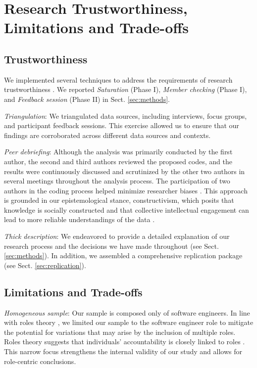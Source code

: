 \section{Research Trustworthiness, Limitations and Trade-offs}\label{sec:trust}

\subsection{Trustworthiness}

\noindent We implemented several techniques to address the requirements of research trustworthiness \citep{miles2014qualitative}. We reported \textit{Saturation} (Phase I), \textit{Member checking} (Phase I), and \emph{Feedback session} (Phase II) in Sect. \ref{sec:methods}.

\textit{Triangulation}: We triangulated data sources, including interviews, focus groups, and participant feedback sessions. This exercise allowed us to ensure that our findings are corroborated across different data sources and contexts.

\textit{Peer debriefing}: Although the analysis was primarily conducted by the first author, the second and third authors reviewed the proposed codes, and the results were continuously discussed and scrutinized by the other two authors in several meetings throughout the analysis process. The participation of two authors in the coding process helped minimize researcher biases \citep{miles2014qualitative}. This approach is grounded in our epistemological stance, constructivism, which posits that knowledge is socially constructed and that collective intellectual engagement can lead to more reliable understandings of the data \citep{fosnot2013constructivism}. 

\textit{Thick description}: We endeavored to provide a detailed explanation of our research process and the decisions we have made throughout (see Sect. \ref{sec:methods}). In addition, we assembled a comprehensive replication package (see Sect. \ref{sec:replication}).

\subsection{Limitations and Trade-offs}\label{sec:limit}

\textit{Homogeneous sample}: Our sample is composed only of software engineers. In line with roles theory \citep{katz1978social,frink2004advancing}, we limited our sample to the software engineer role to mitigate the potential for variations that may arise by the inclusion of multiple roles. Roles theory suggests that individuals' accountability is closely linked to roles \citep{katz1978social,frink2004advancing}. This narrow focus strengthens the internal validity of our study and allows for role-centric conclusions.

